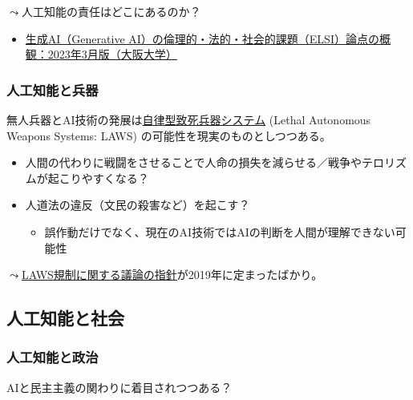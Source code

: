 \documentclass[
  xelatex,
  ja=standard]{bxjsarticle}
\providecommand{\tightlist}{%
  \setlength{\itemsep}{0pt}\setlength{\parskip}{0pt}}\usepackage{longtable,booktabs,array}
\begin{document}
\(\leadsto\)人工知能の責任はどこにあるのか？

\begin{itemize}
\tightlist
\item
  \href{https://elsi.osaka-u.ac.jp/research/2120}{生成AI（Generative
  AI）の倫理的・法的・社会的課題（ELSI）論点の概観：2023年3月版（大阪大学）}
\end{itemize}

\hypertarget{ux4ebaux5de5ux77e5ux80fdux3068ux5175ux5668}{%
\subsubsection{人工知能と兵器}\label{ux4ebaux5de5ux77e5ux80fdux3068ux5175ux5668}}

無人兵器とAI技術の発展は\href{https://www.mofa.go.jp/mofaj/dns/ca/page24_001191.html}{自律型致死兵器システム}
(Lethal Autonomous Weapons Systems: LAWS)
の可能性を現実のものとしつつある。

\begin{itemize}
\tightlist
\item
  人間の代わりに戦闘をさせることで人命の損失を減らせる／戦争やテロリズムが起こりやすくなる？
\item
  人道法の違反（文民の殺害など）を起こす？

  \begin{itemize}
  \tightlist
  \item
    誤作動だけでなく、現在のAI技術ではAIの判断を人間が理解できない可能性
  \end{itemize}
\end{itemize}

\(\leadsto\)\href{https://jsil.jp/archives/expert/2020-10}{LAWS規制に関する議論の指針}が2019年に定まったばかり。

\hypertarget{ux4ebaux5de5ux77e5ux80fdux3068ux793eux4f1a}{%
\subsection{人工知能と社会}\label{ux4ebaux5de5ux77e5ux80fdux3068ux793eux4f1a}}

\hypertarget{ux4ebaux5de5ux77e5ux80fdux3068ux653fux6cbb}{%
\subsubsection{人工知能と政治}\label{ux4ebaux5de5ux77e5ux80fdux3068ux653fux6cbb}}

AIと民主主義の関わりに着目されつつある？
\end{document}

